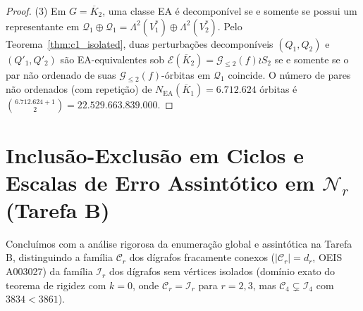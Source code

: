 \documentclass[11pt,a4paper]{article}
\theoremstyle{definition}
\theoremstyle{remark}
\begin{document}
\begin{proof}
(3) Em $G = \overline{K}_2$, uma classe EA é decomponível se e somente se possui um representante em $\mathcal{Q}_1 \oplus \mathcal{Q}_1 = \Lambda^2(V_1^*) \oplus \Lambda^2(V_2^*)$. Pelo Teorema~\ref{thm:c1_isolated}, duas perturbações decomponíveis $(Q_1, Q_2)$ e $(Q'_1, Q'_2)$ são EA-equivalentes sob $\mathcal{E}(\overline{K}_2) = \mathcal{G}_{\le 2}(f) \wr S_2$ se e somente se o par não ordenado de suas $\mathcal{G}_{\le 2}(f)$-órbitas em $\mathcal{Q}_1$ coincide. O número de pares não ordenados (com repetição) de $N_{\mathrm{EA}}(\overline{K}_1) = 6.712.624$ órbitas é $\binom{6.712.624 + 1}{2} = 22.529.663.839.000$.
\end{proof}

\vspace{8pt}
\section{Inclusão-Exclusão em Ciclos e Escalas de Erro Assintótico em $\mathcal{N}_r$ (Tarefa B)}

Concluímos com a análise rigorosa da enumeração global e assintótica na Tarefa B, distinguindo a família $\mathcal{C}_r$ dos dígrafos fracamente conexos ($|\mathcal{C}_r| = d_r$, OEIS A003027) da família $\mathcal{I}_r$ dos dígrafos sem vértices isolados (domínio exato do teorema de rigidez com $k=0$, onde $\mathcal{C}_r = \mathcal{I}_r$ para $r=2,3$, mas $\mathcal{C}_4 \subsetneq \mathcal{I}_4$ com $3834 < 3861$).
\end{document}
